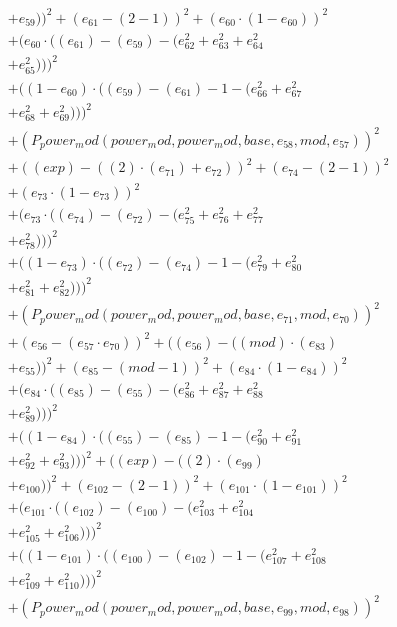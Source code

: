 \documentclass[10pt, a4paper]{article}
\begin{document}
\begin{align*}
& + e_{59}))^{2} + (e_{61} - (2 - 1))^{2} + (e_{60}  \cdot  (1 - e_{60}))^{2} \\
& + (e_{60}  \cdot  ((e_{61}) - (e_{59}) - (e_{62}^{2} + e_{63}^{2} + e_{64}^{2} \\
& + e_{65}^{2})))^{2} \\
& + ((1 - e_{60})  \cdot  ((e_{59}) - (e_{61}) - 1 - (e_{66}^{2} + e_{67}^{2} \\
& + e_{68}^{2} + e_{69}^{2})))^{2} \\
& + (P_power_mod(power_mod, power_mod, base, e_{58}, mod, e_{57}))^{2} \\
& + ((exp) - ((2)  \cdot  (e_{71}) + e_{72}))^{2} + (e_{74} - (2 - 1))^{2} \\
& + (e_{73}  \cdot  (1 - e_{73}))^{2} \\
& + (e_{73}  \cdot  ((e_{74}) - (e_{72}) - (e_{75}^{2} + e_{76}^{2} + e_{77}^{2} \\
& + e_{78}^{2})))^{2} \\
& + ((1 - e_{73})  \cdot  ((e_{72}) - (e_{74}) - 1 - (e_{79}^{2} + e_{80}^{2} \\
& + e_{81}^{2} + e_{82}^{2})))^{2} \\
& + (P_power_mod(power_mod, power_mod, base, e_{71}, mod, e_{70}))^{2} \\
& + (e_{56} - (e_{57}  \cdot  e_{70}))^{2} + ((e_{56}) - ((mod)  \cdot  (e_{83}) \\
& + e_{55}))^{2} + (e_{85} - (mod - 1))^{2} + (e_{84}  \cdot  (1 - e_{84}))^{2} \\
& + (e_{84}  \cdot  ((e_{85}) - (e_{55}) - (e_{86}^{2} + e_{87}^{2} + e_{88}^{2} \\
& + e_{89}^{2})))^{2} \\
& + ((1 - e_{84})  \cdot  ((e_{55}) - (e_{85}) - 1 - (e_{90}^{2} + e_{91}^{2} \\
& + e_{92}^{2} + e_{93}^{2})))^{2} + ((exp) - ((2)  \cdot  (e_{99}) \\
& + e_{100}))^{2} + (e_{102} - (2 - 1))^{2} + (e_{101}  \cdot  (1 - e_{101}))^{2} \\
& + (e_{101}  \cdot  ((e_{102}) - (e_{100}) - (e_{103}^{2} + e_{104}^{2} \\
& + e_{105}^{2} + e_{106}^{2})))^{2} \\
& + ((1 - e_{101})  \cdot  ((e_{100}) - (e_{102}) - 1 - (e_{107}^{2} + e_{108}^{2} \\
& + e_{109}^{2} + e_{110}^{2})))^{2} \\
& + (P_power_mod(power_mod, power_mod, base, e_{99}, mod, e_{98}))^{2} \\

\end{align*}
\end{document}
